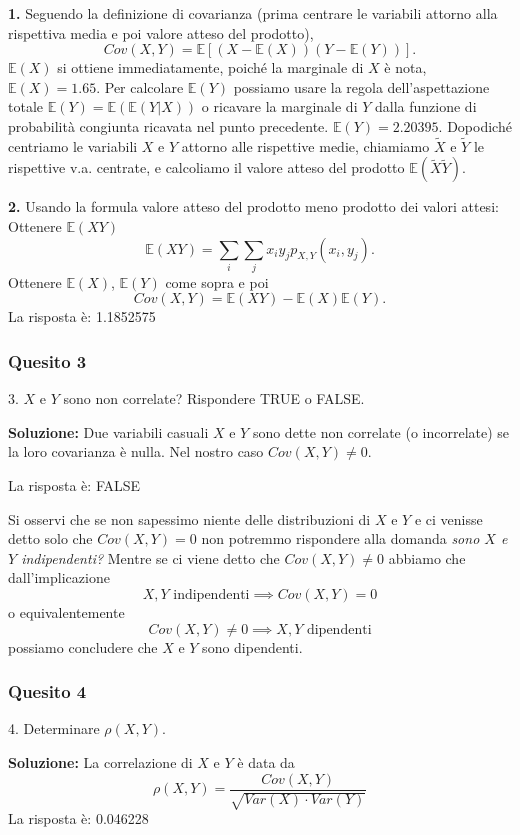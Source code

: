\documentclass[12pt, a4paper]{article}
\begin{document}
\textbf{1.} Seguendo la definizione di covarianza (prima centrare le variabili attorno alla rispettiva media e poi valore atteso del prodotto), 
$$ Cov(X,Y) = \mathbb{E}[(X-\mathbb{E}(X))(Y-\mathbb{E}(Y))]. $$
$\mathbb{E}(X)$ si ottiene immediatamente, poiché la marginale di $X$ è nota, $\mathbb{E}(X)=1.65$. Per calcolare $\mathbb{E}(Y)$ possiamo usare la regola dell’aspettazione totale $\mathbb{E}(Y) = \mathbb{E}(\mathbb{E}(Y|X))$ o ricavare la marginale di $Y$ dalla funzione di probabilità congiunta ricavata nel punto precedente. $\mathbb{E}(Y)=2.20395$.
Dopodiché centriamo le variabili $X$ e $Y$ attorno alle rispettive medie, chiamiamo $\tilde{X}$ e $\tilde{Y}$ le rispettive v.a. centrate, e calcoliamo il valore atteso del prodotto $\mathbb{E}(\tilde{X}\tilde{Y})$.

\textbf{2.} Usando la formula valore atteso del prodotto meno prodotto dei valori attesi:
Ottenere $\mathbb{E}(XY)$ 
$$ \mathbb{E}(XY) = \sum_i \sum_j x_i y_j p_{X,Y}(x_i, y_j). $$
Ottenere $\mathbb{E}(X)$, $\mathbb{E}(Y)$ come sopra e poi 
$$ Cov(X,Y) = \mathbb{E}(XY) - \mathbb{E}(X)\mathbb{E}(Y). $$
La risposta è: 1.1852575

\subsubsection*{Quesito 3}
3. $X$ e $Y$ sono non correlate? Rispondere TRUE o FALSE.

\textbf{Soluzione:}
Due variabili casuali $X$ e $Y$ sono dette non correlate (o incorrelate) se la loro covarianza è nulla. Nel nostro caso $Cov(X,Y) \neq 0$.

La risposta è: FALSE

Si osservi che se non sapessimo niente delle distribuzioni di $X$ e $Y$ e ci venisse detto solo che $Cov(X,Y)=0$ non potremmo rispondere alla domanda \textit{sono $X$ e $Y$ indipendenti?}
Mentre se ci viene detto che $Cov(X,Y) \neq 0$ abbiamo che dall’implicazione 
$$ X,Y \text{ indipendenti} \implies Cov(X,Y)=0 $$
o equivalentemente 
$$ Cov(X,Y) \neq 0 \implies X,Y \text{ dipendenti} $$
possiamo concludere che $X$ e $Y$ sono dipendenti.

\subsubsection*{Quesito 4}
4. Determinare $\rho(X,Y)$.

\textbf{Soluzione:}
La correlazione di $X$ e $Y$ è data da
$$ \rho(X,Y) = \frac{Cov(X,Y)}{\sqrt{Var(X) \cdot Var(Y)}} $$
La risposta è: 0.046228
\end{document}
